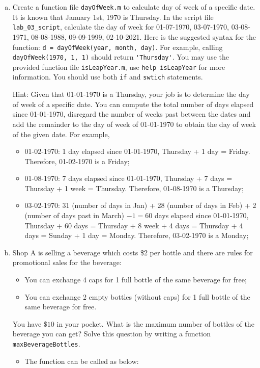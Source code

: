 \begin{enumerate}[(a)]
  \item Create a function file \verb|dayOfWeek.m| to calculate day of week of a specific date. It is known that January 1st, 1970 is Thursday. In the script file \verb|lab_03_script|, calculate the day of week for 01-07-1970, 03-07-1970, 03-08-1971, 08-08-1988, 09-09-1999, 02-10-2021. Here is the suggested syntax for the function: \verb|d = dayOfWeek(year, month, day)|. For example, calling \verb|dayOfWeek(1970, 1, 1)| should return \verb|'Thursday'|. You may use the provided function file \verb|isLeapYear.m|, use \verb|help isLeapYear| for more information. You should use both \verb|if| and \verb|swtich| statements.

    Hint: Given that 01-01-1970 is a Thursday, your job is to determine the day of week of a specific date. You can compute the total number of days elapsed since 01-01-1970, disregard the number of weeks past between the dates and add the remainder to the day of week of 01-01-1970 to obtain the day of week of the given date. For example,
    \begin{itemize}
      \item 01-02-1970: 1 day elapsed since 01-01-1970, Thursday + 1 day = Friday. Therefore, 01-02-1970 is a Friday;
      \item 01-08-1970: 7 days elapsed since 01-01-1970, Thursday + 7 days = Thursday + 1 week = Thursday. Therefore, 01-08-1970 is a Thursday;
      \item 03-02-1970: 31 (number of days in Jan) + 28 (number of days in Feb) + 2 (number of days past in March) $- 1 = 60$ days elapsed since 01-01-1970, Thursday + 60 days = Thursday + 8 week + 4 days = Thursday + 4 days = Sunday + 1 day = Monday. Therefore, 03-02-1970 is a Monday;
    \end{itemize}
  \item Shop A is selling a beverage which costs \$2 per bottle and there are rules for promotional sales for the beverage:
    \begin{itemize}
      \item You can exchange 4 caps for 1 full bottle of the same beverage for free;
      \item You can exchange 2 empty bottles (without caps) for 1 full bottle of the same beverage for free.
    \end{itemize}
    You have $\$10$ in your pocket. What is the maximum number of bottles of the beverage you can get? Solve this question by writing a function \verb|maxBeverageBottles|.
    \begin{itemize}
      \item The function can be called as below:


\end{itemize}
\end{enumerate}
